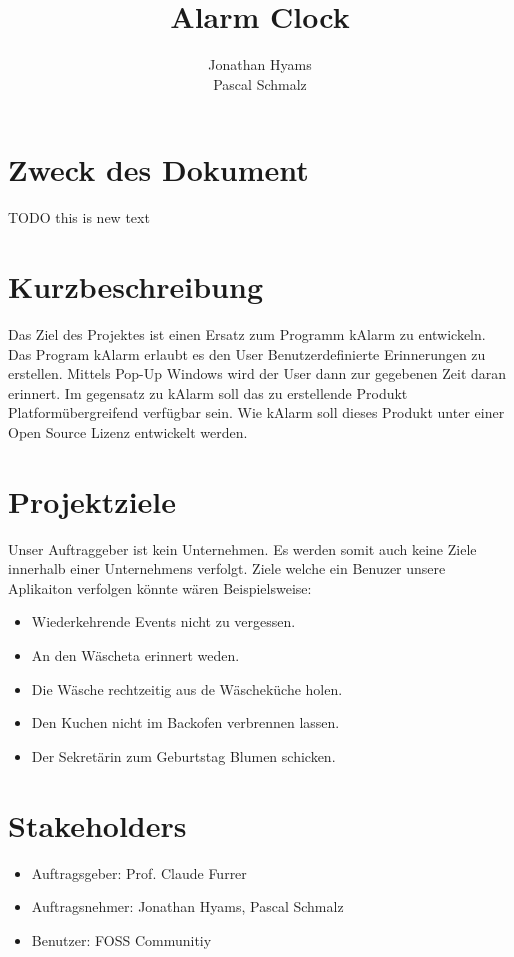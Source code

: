 \documentclass[11pt,titelpage]{scrreprt}
\title{Alarm Clock }
\author{Jonathan Hyams \\Pascal Schmalz}
\begin{document}
\thispagestyle{empty}
\maketitle
\tableofcontents

\pagestyle{fancy}


\begin{abstract}
\end{abstract}
\section{Zweck des Dokument}
TODO this is new text

\section{Kurzbeschreibung}
Das Ziel des Projektes ist einen Ersatz zum Programm kAlarm zu entwickeln.
Das Program kAlarm erlaubt es den User Benutzerdefinierte Erinnerungen zu erstellen. Mittels Pop-Up Windows wird der User dann zur gegebenen Zeit daran erinnert.
Im gegensatz zu kAlarm soll das zu erstellende Produkt Platformübergreifend verfügbar sein. Wie kAlarm soll dieses Produkt unter einer Open Source Lizenz entwickelt werden.
\section{Projektziele}
Unser Auftraggeber ist kein Unternehmen. Es werden somit auch keine Ziele innerhalb einer Unternehmens verfolgt.
Ziele welche ein Benuzer unsere Aplikaiton verfolgen könnte wären Beispielsweise:
\begin{itemize}
 \item Wiederkehrende Events nicht zu vergessen.
 \item An den Wäscheta erinnert weden.
 \item Die Wäsche rechtzeitig aus de Wäscheküche holen.
\item Den Kuchen nicht im Backofen verbrennen lassen.
 \item Der Sekretärin zum Geburtstag Blumen schicken.
 
\end{itemize}

\section{Stakeholders}
\begin{itemize}
\item{Auftragsgeber: Prof. Claude Furrer}
\item{Auftragsnehmer: Jonathan Hyams, Pascal Schmalz}
\item{Benutzer: FOSS Communitiy}
\end{itemize}
\end{document}
